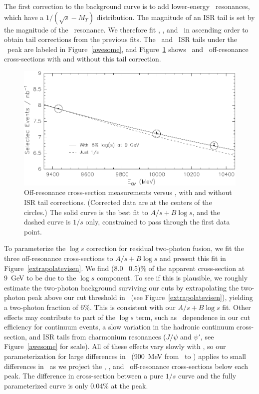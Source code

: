 \documentclass{cornell}
\begin{document}
The first correction to the background curve is to add lower-energy
\ups\ resonances, which have a $1/(\sqrt{s} - M_\Upsilon)$
distribution.  The magnitude of an ISR tail is set by the magnitude of
the \ups\ resonance.  We therefore fit \us, \uss, and \usss\ in
ascending order to obtain tail corrections from the previous fits.
The \us\ and \uss\ ISR tails under the \usss\ peak are labeled in
Figure~\ref{awesome}, and Figure~\ref{logsfit} shows \uss\ and \usss\
off-resonance cross-sections with and without this tail correction.

\begin{figure}[p]
  \begin{center}
    \includegraphics[width=\linewidth]{plots/logsfit}
  \end{center}
  \caption[Off-resonance effective cross-section as a function of
  \ecm]{\label{logsfit} Off-resonance cross-section measurements
  versus \ecm, with and without ISR tail corrections.  (Corrected data
  are at the centers of the circles.)  The solid curve is the best fit
  to $A/s+B\log s$, and the dashed curve is $1/s$ only, constrained to
  pass through the first data point.}
\end{figure}

\label{pag:logs}
To parameterize the $\log s$ correction for residual two-photon
fusion, we fit the three off-resonance cross-sections to $A/s + B\log
s$ and present this fit in Figure~\ref{extrapolatevisen}.  We find
(8.0 \PM\ 0.5)\% of the apparent cross-section at 9~GeV to be due to
the $\log s$ component.  To see if this is plausible, we roughly
estimate the two-photon background surviving our cuts by extrapolating
the two-photon peak above our cut threshold in \visen\ (see
Figure~\ref{extrapolatevisen}), yielding a two-photon fraction of 6\%.
This is consistent with our $A/s+B\log s$ fit.  Other effects may
contribute to part of the $\log s$ term, such as \ecm\ dependence in
our cut efficiency for continuum events, a slow variation in the
hadronic continuum cross-section, and ISR tails from charmonium
resonances ($J/\psi$ and $\psi'$, see Figure~\ref{awesome} for scale).
All of these effects vary slowly with \ecm, so our parameterization
for large differences in \ecm\ (900~MeV from \us\ to \usss) applies to
small differences in \ecm\ as we project the \us, \uss, and \usss\
off-resonance cross-sections below each peak.  The difference in
cross-section between a pure $1/s$ curve and the fully parameterized
curve is only 0.04\% at the peak.
\end{document}
